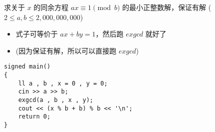 \documentclass[E:/GsjzTle/main/main.tex]{subfiles}
\begin{document}
求关于 \(x\) 的同余方程 \(a x \equiv 1 \pmod {b}\)
的最小正整数解，保证有解 (\(2 ≤a, b≤ 2,000,000,000\))

\begin{itemize}
\item
  式子可等价于 \(ax + by = 1\)，然后跑 \(exgcd\) 就好了
\item
  (因为保证有解，所以可以直接跑 \(exgcd\))
\end{itemize}

\begin{lstlisting}
signed main()
{
	ll a , b , x = 0 , y = 0;
	cin >> a >> b;
	exgcd(a , b , x , y);
	cout << (x % b + b) % b << '\n';
	return 0;
}
\end{lstlisting}
\end{document}
